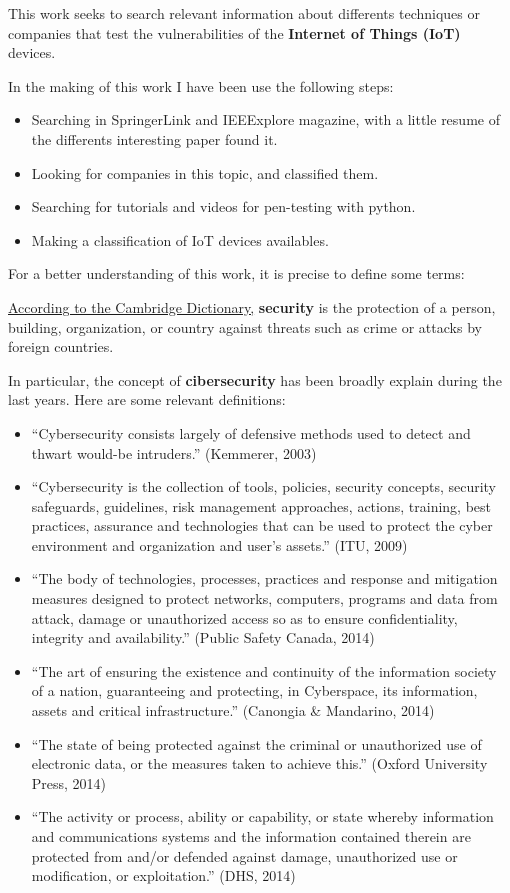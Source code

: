 
This work seeks to search relevant information about differents techniques or companies that test the vulnerabilities of the \textbf{Internet of Things (IoT)} devices.

In the making of this work I have been use the following steps:
\begin{itemize}
	\item Searching in SpringerLink and IEEExplore magazine, with a little resume of the differents interesting paper found it.
	\item Looking for companies in this topic, and classified them.
	\item Searching for tutorials and videos for pen-testing with python.
	\item Making a classification of IoT devices availables.
\end{itemize}

For a better understanding of this work, it is precise to define some terms:

\href{http://dictionary.cambridge.org/es/diccionario/ingles/security}{According to the Cambridge Dictionary,} \textbf{security} is the protection of a person, building, organization, or country against threats such as crime or attacks by foreign countries. 

In particular, the concept of \textbf{cibersecurity} has been broadly explain during the last years. Here are some relevant definitions:\cite{Paper0}
\begin{itemize}
	\item ``Cybersecurity consists largely of defensive methods used to detect and thwart would-be intruders.'' (Kemmerer, 2003)
	\item ``Cybersecurity is the collection of tools, policies, security concepts, security safeguards, guidelines, risk management approaches, actions, training, best practices, assurance and technologies that can be used to protect the cyber environment and organization and user's assets.'' (ITU, 2009)
	\item “The body of technologies, processes, practices and response and mitigation measures designed to protect networks, computers, programs and data from attack, damage or unauthorized access so as to ensure confidentiality, integrity and availability.”  (Public Safety Canada, 2014)
	\item “The art of ensuring the existence and continuity of the information society of a nation, guaranteeing and protecting, in Cyberspace, its information, assets and critical infrastructure.” (Canongia \& Mandarino, 2014)
	\item “The state of being protected against the criminal or unauthorized use of electronic data, or the measures taken to achieve this.” (Oxford University Press, 2014)
	\item “The activity or process, ability or capability, or state whereby information and communications systems and the information contained therein are protected from and/or defended against damage, unauthorized use or modification, or exploitation.” (DHS, 2014)
\end{itemize}

